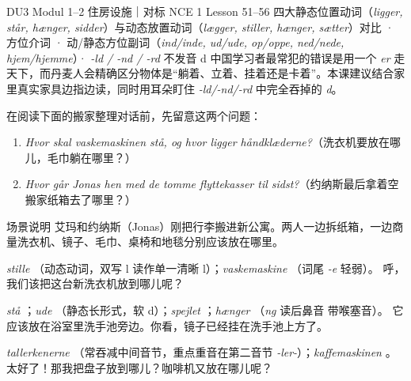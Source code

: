 {DU3 Modul 1--2 住房设施｜对标 NCE 1 Lesson 51--56}
{四大静态位置动词（\textit{ligger, står, hænger, sidder}）与动态放置动词（\textit{lægger, stiller, hænger, sætter}）对比 · 方位介词 · 动/静态方位副词（\textit{ind/inde, ud/ude, op/oppe, ned/nede, hjem/hjemme}）· \textit{-ld / -nd / -rd} 不发音 d}
{中国学习者最常犯的错误是用一个 \textit{er} 走天下，而丹麦人会精确区分物体是“躺着、立着、挂着还是卡着”。本课建议结合家里真实家具边指边读，同时用耳朵盯住 \textit{-ld/-nd/-rd} 中完全吞掉的 \textit{d}。}

\begin{foerduleaeser}
在阅读下面的搬家整理对话前，先留意这两个问题：
\begin{enumerate}
  \item \textit{Hvor skal vaskemaskinen stå, og hvor ligger håndklæderne?}（洗衣机要放在哪儿，毛巾躺在哪里？）
  \item \textit{Hvor går Jonas hen med de tomme flyttekasser til sidst?}（约纳斯最后拿着空搬家纸箱去了哪里？）
\end{enumerate}
\end{foerduleaeser}


\begin{tipbox}{场景说明}
艾玛和约纳斯（Jonas）刚把行李搬进新公寓。两人一边拆纸箱，一边商量洗衣机、镜子、毛巾、桌椅和地毯分别应该放在哪里。
\end{tipbox}

{\textit{stille} （动态动词，双写 l 读作单一清晰 l）；\textit{vaskemaskine} （词尾 \textit{-e} 轻弱）。}
{呼，我们该把这台新洗衣机放到哪儿呢？}

{\textit{stå} ；\textit{ude} （静态长形式，软 d）；\textit{spejlet} ；\textit{hænger} （\textit{ng} 读后鼻音  带喉塞音）。}
{它应该放在浴室里洗手池旁边。你看，镜子已经挂在洗手池上方了。}

{\textit{tallerkenerne} （常吞减中间音节，重点重音在第二音节 \textit{-ler-}）；\textit{kaffemaskinen} 。}
{太好了！那我把盘子放到哪儿？咖啡机又放在哪儿呢？}

